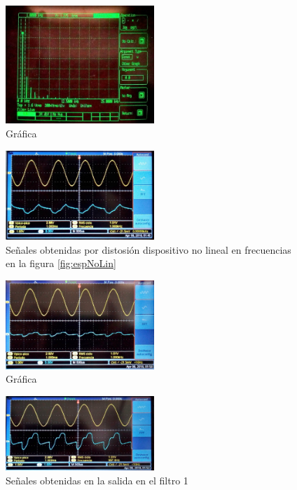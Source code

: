 \documentclass{article}
\begin{document}
\begin{figure}[h!]
    \centering
    \includegraphics[width=0.5\textwidth]{Imagenes/SistComDistAlin4.png}
    \caption{Gráfica}
    \label{fig:grafA}
\end{figure}

\begin{figure}[h!]
    \centering
    \includegraphics[width=0.5\textwidth]{Imagenes/SistComDistAlin5.jpg}
    \caption{Señales obtenidas por distosión dispositivo no lineal en frecuencias en la figura \ref{fig:espNoLin}}
    \label{fig:grafD}
\end{figure}

\begin{figure}[h!]
    \centering
    \includegraphics[width=0.5\textwidth]{Imagenes/SistComDistAlin6.jpg}
    \caption{Gráfica}
    \label{fig:grafE}
\end{figure}




\begin{figure}[h!]
    \centering
    \includegraphics[width=0.5\textwidth]{Imagenes/SistComDistAlin7.jpg}
    \caption{Señales obtenidas en la salida en el filtro 1}
    \label{fig:SenialFiltro1}
\end{figure}
\end{document}
